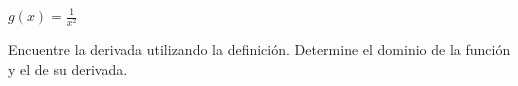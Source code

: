 \item $g(x) = \frac{1}{x^2}$
\par
Encuentre la derivada utilizando la definición. Determine el dominio de la función y el de su derivada.
